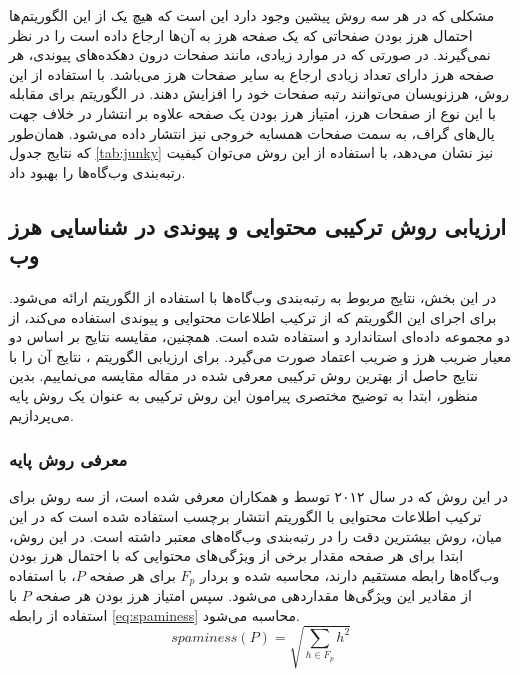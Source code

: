 \documentclass[twoside, a4paper,11pt]{book}
\numberwithin{equation}{chapter}
\numberwithin{table}{chapter}
\numberwithin{figure}{chapter}
\numberwithin{equation}{chapter}
\begin{document}
مشکلی که در هر سه روش پیشین وجود دارد این است که هیچ یک از این الگوریتم‌ها احتمال هرز بودن صفحاتی که یک صفحه هرز به آن‌‌ها ارجاع داده است را در نظر نمی‌گیرند. در صورتی که در موارد زیادی، مانند صفحات درون دهکده‌های پیوندی، هر صفحه هرز دارای تعداد زیادی ارجاع به سایر صفحات هرز می‌باشد. با استفاده از این روش، هرزنویسان می‌توانند رتبه صفحات خود را افزایش دهند. 
در الگوریتم  برای مقابله با این نوع از صفحات هرز، امتیاز هرز بودن یک صفحه علاوه بر انتشار در خلاف جهت یال‌های گراف، به سمت صفحات همسایه خروجی نیز انتشار داده می‌شود. 
همان‌طور که نتایج جدول \ref{tab:junky} نیز نشان می‌دهد، با استفاده از این روش می‌توان کیفیت رتبه‌بندی وب‌گاه‌‌ها را بهبود داد. 

\subsection{ارزیابی روش ترکیبی محتوایی و پیوندی در شناسایی هرز وب}
\label{subsection:experiments-results-contentandlink}
در این بخش، نتایج مربوط به رتبه‌بندی وب‌گاه‌ها با استفاده از الگوریتم  ارائه می‌شود. برای اجرای این الگوریتم که از ترکیب اطلاعات محتوایی و پیوندی استفاده می‌کند، از دو مجموعه داده‌ای استاندارد  و  استفاده شده است. همچنین، مقایسه نتایج بر اساس دو معیار ضریب هرز و ضریب اعتماد صورت می‌گیرد. برای ارزیابی الگوریتم ، نتایج آن را با نتایج حاصل از بهترین روش ترکیبی معرفی شده در مقاله \cite{polar2012} مقایسه می‌نماییم. بدین منظور، ابتدا به توضیح مختصری پیرامون این روش ترکیبی به عنوان یک روش پایه می‌پردازیم. 
\subsubsection{معرفی روش پایه}
در این روش که در سال ۲۰۱۲ توسط  و همکاران \cite{polar2012} معرفی شده است، از سه روش برای ترکیب اطلاعات محتوایی با الگوریتم انتشار برچسب استفاده شده است که در این میان، روش  بیشترین دقت را در رتبه‌بندی وب‌گاه‌های معتبر داشته است. در این روش، ابتدا برای هر صفحه مقدار برخی از ویژگی‌های محتوایی که با احتمال هرز بودن وب‌گاه‌ها رابطه مستقیم دارند، محاسبه شده و بردار $F_p$ برای هر صفحه $P$، با استفاده از مقادیر این ویژگی‌ها مقداردهی می‌شود. سپس امتیاز هرز بودن هر صفحه $P$ با استفاده از رابطه \ref{eq:spaminess} محاسبه می‌شود. 
\begin{equation}
\label{eq:spaminess}
spaminess(P) =  \sqrt {\sum_{h \in F_p} h^2}
\end{equation}
\end{document}
